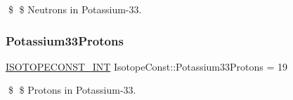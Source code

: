 \$ \$ Neutrons in Potassium-\/33. \mbox{\label{group___isotope_const-_potassium-_k33_ga6615a89c387b9fd40715a210d3ead4a8}} 
\subsubsection{\texorpdfstring{Potassium33\+Protons}{Potassium33Protons}}
{\footnotesize\ttfamily \mbox{\hyperlink{group___isotope_const-_macros_ga5f18360b3e99483a35c32d789e62621c}{I\+S\+O\+T\+O\+P\+E\+C\+O\+N\+S\+T\+\_\+\+I\+NT}} Isotope\+Const\+::\+Potassium33\+Protons = 19}

\$ \$ Protons in Potassium-\/33. 